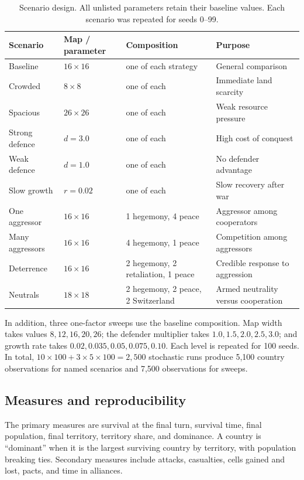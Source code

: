\documentclass[10pt,twocolumn]{article}
\begin{document}
\begin{table}[t]
\centering
\caption{Scenario design.  All unlisted parameters retain their baseline
values.  Each scenario was repeated for seeds 0--99.}
\label{tab:scenarios}
\begin{tabularx}{\textwidth}{l l Y l}
\toprule
Scenario & Map / parameter & Composition & Purpose \\
\midrule
Baseline & $16\times16$ & one of each strategy & General comparison \\
Crowded & $8\times8$ & one of each & Immediate land scarcity \\
Spacious & $26\times26$ & one of each & Weak resource pressure \\
Strong defence & $d=3.0$ & one of each & High cost of conquest \\
Weak defence & $d=1.0$ & one of each & No defender advantage \\
Slow growth & $r=0.02$ & one of each & Slow recovery after war \\
One aggressor & $16\times16$ & 1 hegemony, 4 peace & Aggressor among cooperators \\
Many aggressors & $16\times16$ & 4 hegemony, 1 peace & Competition among aggressors \\
Deterrence & $16\times16$ & 2 hegemony, 2 retaliation, 1 peace & Credible response to aggression \\
Neutrals & $18\times18$ & 2 hegemony, 2 peace, 2 Switzerland & Armed neutrality versus cooperation \\
\bottomrule
\end{tabularx}
\end{table}

In addition, three one-factor sweeps use the baseline composition.  Map width
takes values $8,12,16,20,26$; the defender multiplier takes
$1.0,1.5,2.0,2.5,3.0$; and growth rate takes
$0.02,0.035,0.05,0.075,0.10$.  Each level is repeated for 100 seeds.  In
total, $10\times100+3\times5\times100=2{,}500$ stochastic runs produce 5,100
country observations for named scenarios and 7,500 observations for sweeps.

\subsection{Measures and reproducibility}

The primary measures are survival at the final turn, survival time, final
population, final territory, territory share, and dominance.  A country is
``dominant'' when it is the largest surviving country by territory, with
population breaking ties.  Secondary measures include attacks, casualties,
cells gained and lost, pacts, and time in alliances.
\end{document}
